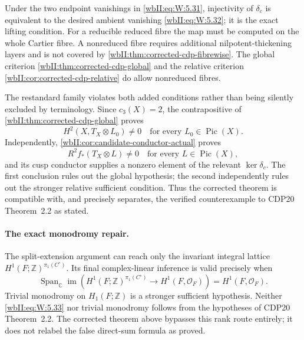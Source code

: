 \begin{remark}
Under the two endpoint vanishings in \eqref{wbII:eq:W:5.31}, injectivity of \(\delta_c\) is
equivalent to the desired ambient vanishing \eqref{wbII:eq:W:5.32}; it is the exact lifting condition.  For a reducible reduced fibre the
map must be computed on the whole Cartier fibre.  A nonreduced fibre requires
additional nilpotent-thickening layers and is not covered by
\cref{wbII:thm:corrected-cdp-fibrewise}.  The global criterion
\cref{wbII:thm:corrected-cdp-global} and the relative criterion
\cref{wbII:cor:corrected-cdp-relative} do allow nonreduced fibres.

The restandard family violates both added conditions rather than being
silently excluded by terminology.  Since \(c_3(X)=2\), the contrapositive of
\cref{wbII:thm:corrected-cdp-global} proves
\[
 H^2(X,T_X\otimes L_0)\ne0
 \quad\text{for every }L_0\in\operatorname{Pic}(X).
\]
Independently, \cref{wbII:cor:candidate-conductor-actual} proves
\[
 R^2f_*(T_X\otimes L)\ne0
 \quad\text{for every }L\in\operatorname{Pic}(X),
\]
and its cusp conductor supplies a nonzero element of the relevant
\(\ker\delta_c\).  The first conclusion rules out the global hypothesis; the
second independently rules out the stronger relative sufficient condition.
Thus the corrected theorem is compatible with, and
precisely separates, the verified counterexample to CDP20
Theorem~2.2 as stated.
\end{remark}

\paragraph{The exact monodromy repair.}
The split-extension argument can reach only the invariant integral lattice
\(H^1(F;\mathbb Z)^{\pi_1(C^\circ)}\).  Its final complex-linear inference is
valid precisely when
\[
 \operatorname{Span}_{\mathbb C}\operatorname{im}\!\left(
 H^1(F;\mathbb Z)^{\pi_1(C^\circ)}
 \longrightarrow H^1(F,\mathcal O_F)\right)
 =H^1(F,\mathcal O_F).
\tag{W.60}\label{wbII:eq:W:5.33}
\]
Trivial monodromy on \(H_1(F;\mathbb Z)\) is a stronger sufficient
hypothesis.  Neither \eqref{wbII:eq:W:5.33} nor trivial monodromy follows from the hypotheses
of CDP20 Theorem~2.2.  The corrected theorem above bypasses this rank route
entirely; it does not relabel the false direct-sum formula as proved.

